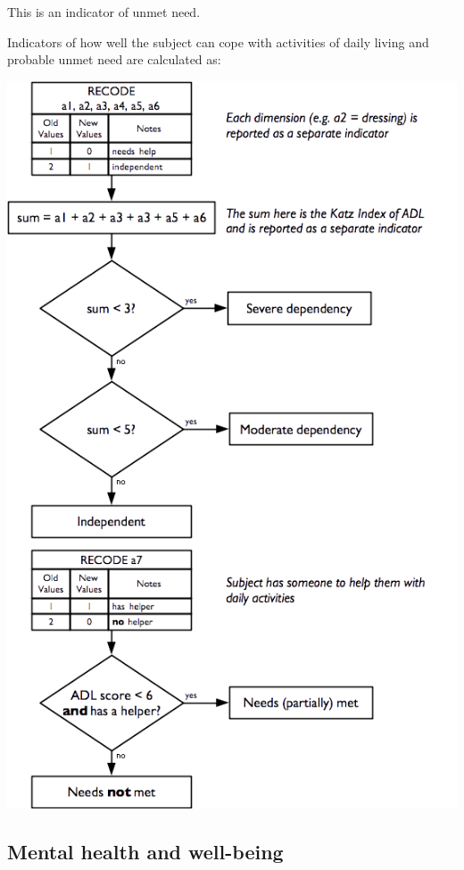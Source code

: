 \documentclass[12pt,a4paper]{book}
\theoremstyle{definition}
\theoremstyle{definition}
\theoremstyle{definition}
\theoremstyle{remark}
\begin{document}
This is an indicator of unmet need.

\newpage

Indicators of how well the subject can cope with activities of daily
living and probable unmet need are calculated as:

\begin{center}\includegraphics{figures/indicators18} \end{center}

\hypertarget{mental-health-and-well-being}{%
\subsection{Mental health and
well-being}\label{mental-health-and-well-being}}
\end{document}
